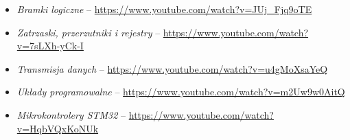 % 
% 
% 
% 

\begin{itemize}
\item \emph{Bramki logiczne} – \url{https://www.youtube.com/watch?v=JUj_Fjq9oTE}
\item \emph{Zatrzaski, przerzutniki i rejestry} – \url{https://www.youtube.com/watch?v=7sLXh-yCk-I}
\item \emph{Transmisja danych} – \url{https://www.youtube.com/watch?v=u4gMoXsaYeQ}
\item \emph{Układy programowalne} – \url{https://www.youtube.com/watch?v=m2Uw9w0AitQ}
\item \emph{Mikrokontrolery STM32} – \url{https://www.youtube.com/watch?v=HqbVQxKoNUk}
\end{itemize}
